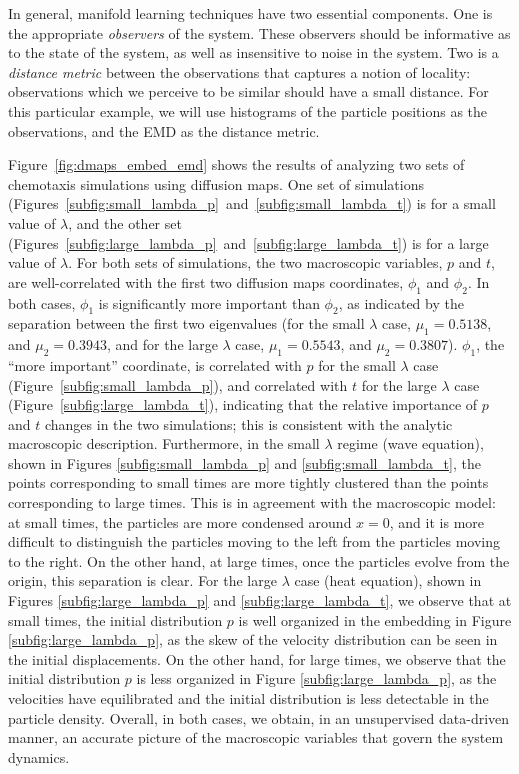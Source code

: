 \documentclass[preprint]{elsarticle}
\begin{document}
In general, manifold learning techniques have two essential components.
%
One is the appropriate {\em observers} of the system. 
%
These observers should be informative as to the state of the system, as well as insensitive to noise in the system. 
%
Two is a {\em distance metric} between the observations that captures a notion of locality: observations which we perceive to be similar should have a small distance. 
%
For this particular example, we will use histograms of the particle positions as the observations, and the EMD as the distance metric.

Figure~\ref{fig:dmaps_embed_emd} shows the results of analyzing two sets of chemotaxis simulations using diffusion maps. 
%
One set of simulations (Figures~\ref{subfig:small_lambda_p}~and~\ref{subfig:small_lambda_t}) is for a small value of $\lambda$, and the other set (Figures~\ref{subfig:large_lambda_p}~and~\ref{subfig:large_lambda_t}) is for a large value of $\lambda$. 
%
For both sets of simulations, the two macroscopic variables, $p$ and $t$, are well-correlated with the first two diffusion maps coordinates, $\phi_1$ and $\phi_2$. 
%
In both cases, $\phi_1$ is significantly more important than $\phi_2$, as indicated by the separation between the first two eigenvalues (for the small $\lambda$ case, $\mu_1 = 0.5138$, and $\mu_2 = 0.3943$, and for the large $\lambda$ case, $\mu_1 = 0.5543$, and $\mu_2 = 0.3807$).
%
$\phi_1$, the ``more important'' coordinate, is correlated with $p$ for the small $\lambda$ case (Figure~\ref{subfig:small_lambda_p}), and correlated with $t$ for the large $\lambda$ case (Figure~\ref{subfig:large_lambda_t}), indicating that the relative importance of $p$ and $t$ changes in the two simulations;
this is consistent with the analytic macroscopic description. 
%
Furthermore, in the small $\lambda$ regime (wave equation), shown in Figures \ref{subfig:small_lambda_p} and \ref{subfig:small_lambda_t}, the points corresponding to small times are more tightly clustered than the points corresponding to large times.
%
This is in agreement with the macroscopic model: at small times, the particles are more condensed around $x=0$, and it is more difficult to distinguish the particles moving to the left from the particles moving to the right. 
%
On the other hand, at large times, once the particles evolve from the origin, this separation is clear.  
%
For the large $\lambda$ case (heat equation), shown in Figures \ref{subfig:large_lambda_p} and \ref{subfig:large_lambda_t}, we observe that at small times, the initial distribution $p$ is well organized in the embedding in Figure \ref{subfig:large_lambda_p}, as the skew of the velocity distribution can be seen in the initial displacements.
%
On the other hand, for large times, we observe that the initial distribution $p$ is less organized in Figure \ref{subfig:large_lambda_p}, as the velocities have equilibrated and the initial distribution is less detectable in the particle density.
%
Overall, in both cases, we obtain, in an unsupervised data-driven manner, an accurate picture of the macroscopic variables that govern the system dynamics.
\end{document}
